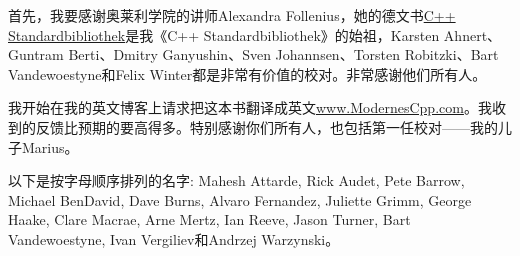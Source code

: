 首先，我要感谢奥莱利学院的讲师Alexandra Follenius，她的德文书\href{http://shop.oreilly.com/product/9783955619688.do}{C++ Standardbibliothek}是我《C++ Standardbibliothek》的始祖，Karsten Ahnert、Guntram Berti、Dmitry Ganyushin、Sven Johannsen、Torsten Robitzki、Bart Vandewoestyne和Felix Winter都是非常有价值的校对。非常感谢他们所有人。

我开始在我的英文博客上请求把这本书翻译成英文\href{http://www.modernescpp.com/index.php/do-you-wan-t-to-proofread-a-book}{www.ModernesCpp.com}。我收到的反馈比预期的要高得多。特别感谢你们所有人，也包括第一任校对——我的儿子Marius。

以下是按字母顺序排列的名字: Mahesh Attarde, Rick Audet, Pete Barrow, Michael BenDavid, Dave Burns, Alvaro Fernandez, Juliette Grimm, George Haake, Clare Macrae, Arne Mertz, Ian Reeve, Jason Turner, Bart Vandewoestyne, Ivan Vergiliev和Andrzej Warzynski。